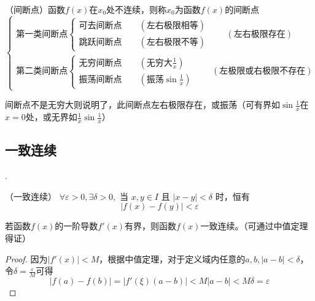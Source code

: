 \begin{definition}
    （间断点）函数$f(x)$在$x_0$处不连续，则称$x_0$为函数$f(x)$的间断点\\
    \begin{math}
        \begin{cases}
            \text{第一类间断点}
            \begin{cases}
                \text{可去间断点}\qquad (\text{左右极限相等}) \\
                \text{跳跃间断点}\qquad (\text{左右极限不等})
            \end{cases}
            \qquad (\text{左右极限存在})
            \\
            \text{第二类间断点}
            \begin{cases}
                \text{无穷间断点}\qquad (\text{无穷大}\frac{1}{x}) \\
                \text{振荡间断点}\qquad (\text{振荡}\sin\frac{1}{x})
            \end{cases}
            \qquad (\text{左极限或右极限不存在})
        \end{cases}
    \end{math}
\end{definition}
间断点不是无穷大则说明了，此间断点左右极限存在，或振荡（可有界如$\sin \frac{1}{x}$在$x=0$处，或无界如$\frac{1}{x}\sin \frac{1}{x}$）


\subsection{一致连续}
.
\begin{definition}
    \label{def:一致连续}
    （一致连续）
    $\forall \varepsilon>0,\exists \delta>0, \text{ 当~}x,y\in I \text{ 且~} \lvert x-y\rvert< \delta \text{ 时，恒有}$
    \[ \left\lvert f(x)-f(y)\right\rvert<\varepsilon \]
\end{definition}
\begin{theorem}
    若函数$f(x)$的一阶导数$f'(x)$有界，则函数$f(x)$一致连续。（可通过中值定理得证）
\end{theorem}
\begin{proof}
    因为$\left\lvert f'(x) \right\rvert < M$，根据中值定理，对于定义域内任意的$a,b,\lvert a-b \rvert < \delta$，令$\delta=\frac{\varepsilon}{M}$可得
    \[
        \left\lvert f(a) - f(b) \right\rvert
        = \left\lvert f'(\xi)(a-b) \right\rvert
        < M\left\lvert a-b \right\rvert
        < M\delta = \varepsilon
    \]
\end{proof}

